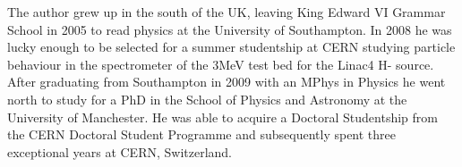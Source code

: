 The author grew up in the south of the UK, leaving King Edward VI Grammar School in 2005 to read physics at the University of Southampton. In 2008 he was lucky enough to be selected for a summer studentship at CERN studying particle behaviour in the spectrometer of the 3MeV test bed for the Linac4 H- source. After graduating from Southampton in 2009 with an MPhys in Physics he went north to study for a PhD in the School of Physics and Astronomy at the University of Manchester. He was able to acquire a Doctoral Studentship from the CERN Doctoral Student Programme and subsequently spent three exceptional years at CERN, Switzerland. 